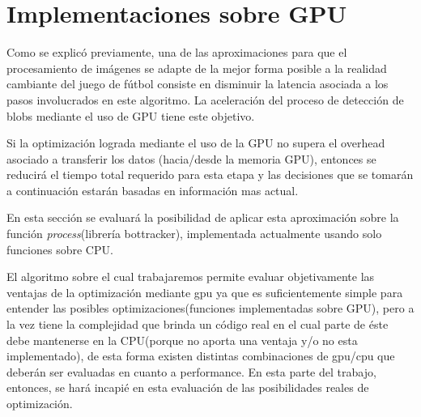 \documentclass[a4paper,10pt]{report}
\begin{document}
\section{Implementaciones sobre GPU}


Como se explicó previamente, una de las aproximaciones para que el procesamiento de imágenes se adapte de la mejor forma posible a la realidad cambiante
del juego de fútbol consiste en disminuir la latencia asociada a los pasos involucrados en este algoritmo.
La aceleración del proceso de detección de blobs mediante el uso de GPU tiene este objetivo. 

Si la optimización lograda mediante el uso de la GPU no supera el overhead asociado a transferir los datos (hacia/desde
la memoria GPU), entonces se reducirá el tiempo total requerido para esta etapa y las decisiones que se tomarán a continuación estarán basadas en información mas actual.


En esta sección se evaluará la posibilidad de aplicar esta aproximación sobre la función \textit{process}(librería bottracker), implementada actualmente usando solo funciones sobre CPU.







El algoritmo sobre el cual trabajaremos permite evaluar objetivamente las ventajas de la optimización mediante gpu ya que es suficientemente simple para entender las posibles optimizaciones(funciones implementadas sobre GPU), pero a la vez tiene la complejidad que brinda un 
código real en el cual parte de éste debe mantenerse en la CPU(porque no aporta una ventaja y/o no esta implementado), de esta forma existen distintas combinaciones de gpu/cpu que deberán ser evaluadas en cuanto a performance.
En esta parte del trabajo, entonces, se hará incapié en esta evaluación de las posibilidades reales de optimización.
\end{document}
